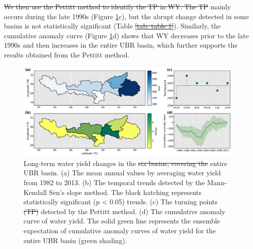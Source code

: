 \documentclass[hess, manuscript]{copernicus}
\providecommand{\DIFaddtex}[1]{{\protect\color{blue}\uwave{#1}}} %
\providecommand{\DIFdeltex}[1]{{\protect\color{red}\sout{#1}}}                      %
\providecommand{\DIFaddbegin}{} %
\providecommand{\DIFaddend}{} %
\providecommand{\DIFdelbegin}{} %
\providecommand{\DIFdelend}{} %
\providecommand{\DIFdelFL}[1]{\DIFdel{#1}} %
\providecommand{\DIFaddbeginFL}{} %
\providecommand{\DIFaddendFL}{} %
\providecommand{\DIFdelbeginFL}{} %
\providecommand{\DIFdelendFL}{} %
\providecommand{\DIFadd}[1]{\texorpdfstring{\DIFaddtex{#1}}{#1}} %
\providecommand{\DIFdel}[1]{\texorpdfstring{\DIFdeltex{#1}}{}} %
\begin{document}
\DIFdel{We then use the Pettitt method to identify the TP in WY. The TP }\DIFdelend \DIFaddbegin \DIFadd{Tp }\DIFaddend mainly occurs during the late 1990s (Figure \ref{fig:water-yield}c), but the abrupt change detected in some basins is not statistically significant (Table \DIFdelbegin \DIFdel{\ref{tab: table 1}}\DIFdelend \DIFaddbegin \DIFadd{\ref{tab:my-table}}\DIFaddend ). Similarly, the cumulative anomaly curve (Figure \ref{fig:water-yield}d) shows that WY decreases prior to the late 1990s and then increases in the entire UBR basin, which further supports the results obtained from the Pettitt method.

\begin{figure}[ht]
    \DIFdelbeginFL %
\DIFdelendFL \DIFaddbeginFL \includegraphics[width=\textwidth]{02-figures/spatial-changes-in-water-yield.png}
    \DIFaddendFL \caption{Long-term water yield changes in the \DIFdelbeginFL \DIFdelFL{six basins, covering the }\DIFdelendFL entire UBR basin.
    (a) The mean annual values by averaging water yield from 1982 to 2013. (b) The temporal trends detected by the Mann-Kendall Sen’s slope method. The black hatching represents statistically significant (p < 0.05) trends. (c) The turning points \DIFdelbeginFL \DIFdelFL{(TP) }\DIFdelendFL detected by the Pettitt method. (d) The cumulative anomaly curve of water yield. The solid green line represents the ensemble expectation of cumulative anomaly curves of water yield for the entire UBR basin (green shading).}
    \label{fig:water-yield}
\end{figure}
\end{document}
